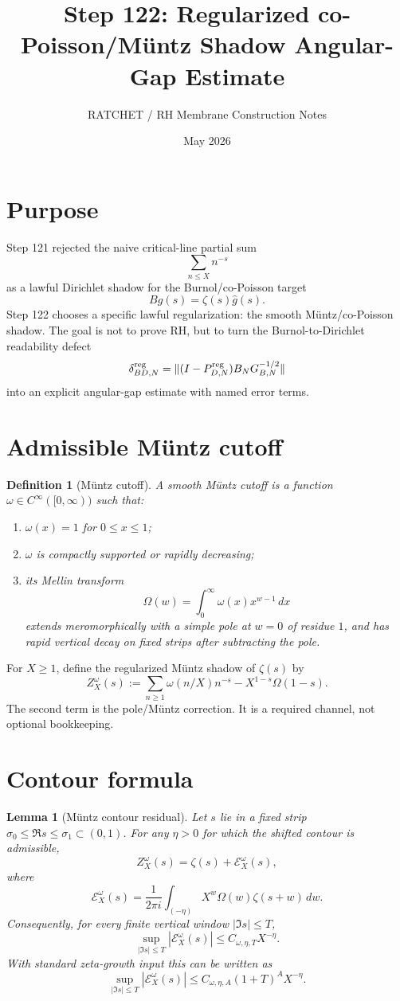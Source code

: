 \documentclass[11pt]{article}
\title{Step 122: Regularized co-Poisson/M\"untz Shadow Angular-Gap Estimate}
\author{RATCHET / RH Membrane Construction Notes}
\date{May 2026}
\newtheorem{lemma}{Lemma}
\newtheorem{definition}{Definition}
\begin{document}
\maketitle

\section{Purpose}
Step 121 rejected the naive critical-line partial sum
\[
  \sum_{n\le X} n^{-s}
\]
as a lawful Dirichlet shadow for the Burnol/co-Poisson target
\[
  B g(s)=\zeta(s)\widehat g(s).
\]
Step 122 chooses a specific lawful regularization: the smooth M\"untz/co-Poisson shadow.  The goal is not to prove RH, but to turn the Burnol-to-Dirichlet readability defect
\[
  \delta_{BD,N}^{\rm reg}
  =\|(I-P_{D,N}^{\rm reg})B_NG_{B,N}^{-1/2}\|
\]
into an explicit angular-gap estimate with named error terms.

\section{Admissible M\"untz cutoff}
\begin{definition}[M\"untz cutoff]
A smooth M\"untz cutoff is a function \(\omega\in C^\infty([0,\infty))\) such that:
\begin{enumerate}[label=(\roman*)]
  \item \(\omega(x)=1\) for \(0\le x\le 1\);
  \item \(\omega\) is compactly supported or rapidly decreasing;
  \item its Mellin transform
  \[
    \Omega(w)=\int_0^\infty \omega(x)x^{w-1}\,dx
  \]
  extends meromorphically with a simple pole at \(w=0\) of residue \(1\), and has rapid vertical decay on fixed strips after subtracting the pole.
\end{enumerate}
\end{definition}

For \(X\ge1\), define the regularized M\"untz shadow of \(\zeta(s)\) by
\[
  Z_X^\omega(s)
  :=
  \sum_{n\ge1}\omega(n/X)n^{-s}
  -X^{1-s}\Omega(1-s).
\]
The second term is the pole/M\"untz correction.  It is a required channel, not optional bookkeeping.

\section{Contour formula}
\begin{lemma}[M\"untz contour residual]
Let \(s\) lie in a fixed strip \(\sigma_0\le \Re s\le \sigma_1\subset(0,1)\).  For any \(\eta>0\) for which the shifted contour is admissible,
\[
  Z_X^\omega(s)=\zeta(s)+\mathcal E_X^\omega(s),
\]
where
\[
  \mathcal E_X^\omega(s)
  =
  \frac{1}{2\pi i}\int_{(-\eta)}X^w\Omega(w)\zeta(s+w)\,dw.
\]
Consequently, for every finite vertical window \(|\Im s|\le T\),
\[
  \sup_{|\Im s|\le T}|\mathcal E_X^\omega(s)|
  \le
  C_{\omega,\eta,T}X^{-\eta}.
\]
With standard zeta-growth input this can be written as
\[
  \sup_{|\Im s|\le T}|\mathcal E_X^\omega(s)|
  \le
  C_{\omega,\eta,A}(1+T)^A X^{-\eta}.
\]
\end{lemma}
\end{document}
